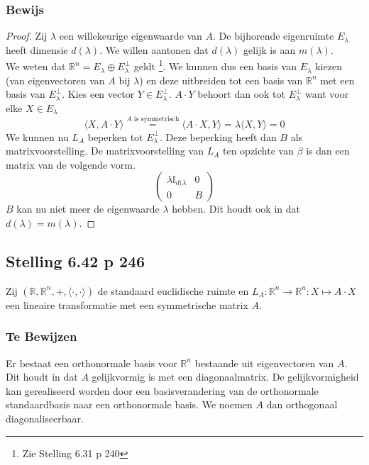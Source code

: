 \documentclass[lineaire_algebra_oplossingen.tex]{subfiles}
\begin{document}
\subsubsection*{Bewijs}
\begin{proof}
Zij $\lambda$ een willekeurige eigenwaarde van $A$. De bijhorende eigenruimte $E_\lambda$ heeft dimensie $d(\lambda)$. We willen aantonen dat $d(\lambda)$ gelijk is aan $m(\lambda)$.\\
We weten dat $\mathbb{R}^n = E_\lambda \oplus E_\lambda^\bot$ geldt \footnote{Zie Stelling 6.31 p 240}. We kunnen dus een basis van $E_\lambda$ kiezen (van eigenvectoren van $A$ bij $\lambda$) en deze uitbreiden tot een basis van $\mathbb{R}^n$ met een basis van $E_\lambda^\bot$.
Kies een vector $Y\in E_\lambda^\bot$. $A\cdot Y$ behoort dan ook tot $E_\lambda^\bot$ want voor elke $X \in E_\lambda$
\[
\langle X, A\cdot Y\rangle \overset{A \text{ is symmetrisch}}{=} \langle A\cdot X, Y \rangle = \lambda \langle X,Y \rangle = 0
\]
We kunnen nu $L_A$ beperken tot $E_\lambda^\bot$. Deze beperking heeft dan $B$ als matrixvoorstelling. De matrixvoorstelling van $L_A$ ten opzichte van $\beta$ is dan een matrix van de volgende vorm.
\[
\begin{pmatrix}
\lambda\mathbb{I}_{d(\lambda} & 0\\
0 & B
\end{pmatrix}
\]
$B$ kan nu niet meer de eigenwaarde $\lambda$ hebben. Dit houdt ook in dat $d(\lambda) = m(\lambda)$.
\end{proof}

\subsection{Stelling 6.42 p 246}
Zij $(\mathbb{R},\mathbb{R}^n,+,\langle \cdot , \cdot \rangle)$ de standaard euclidische ruimte en $L_A : \mathbb{R}^n \rightarrow \mathbb{R}^n: X \mapsto A \cdot X$ een lineaire transformatie met een symmetrische matrix $A$.

\subsubsection*{Te Bewijzen}
Er bestaat een orthonormale basis voor $\mathbb{R}^n$ bestaande uit eigenvectoren van $A$.
Dit houdt in dat $A$ gelijkvormig is met een diagonaalmatrix.
De gelijkvormigheid kan gerealiseerd worden door een basisverandering van de orthonormale standaardbasis naar een orthonormale basis.
We noemen $A$ dan orthogonaal diagonaliseerbaar.
\end{document}
